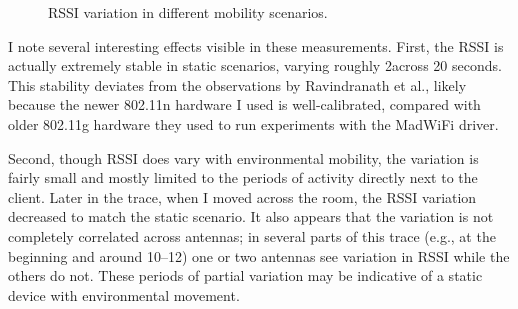 \begin{figure}[htb]
	\hspace{0.06\textwidth}%
	\caption[RSSI variation in different mobility scenarios]{\label{fig:mobility_rssi}RSSI variation in different mobility scenarios.}
\end{figure}

I note several interesting effects visible in these measurements. First, the RSSI is actually extremely stable in static scenarios, varying roughly 2\dB across 20 seconds. This stability deviates from the observations by Ravindranath et al., likely because the newer 802.11n hardware I used is well-calibrated, compared with older 802.11g hardware they used to run experiments with the MadWiFi driver.

Second, though RSSI does vary with environmental mobility, the variation is fairly small and mostly limited to the periods of activity directly next to the client. Later in the trace, when I moved across the room, the RSSI variation decreased to match the static scenario. It also appears that the variation is not completely correlated across antennas; in several parts of this trace (e.g., at the beginning and around 10\s--12\s) one or two antennas see variation in RSSI while the others do not. These periods of partial variation may be indicative of a static device with environmental movement.

